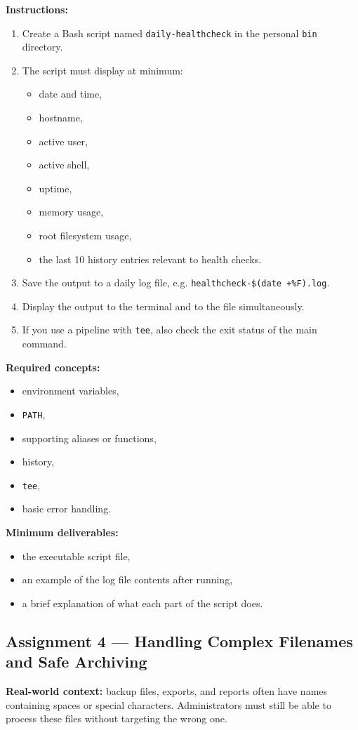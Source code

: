 \textbf{Instructions:}
\begin{enumerate}
  \item Create a Bash script named \texttt{daily-healthcheck} in the personal
    \texttt{bin} directory.
  \item The script must display at minimum:
  \begin{itemize}
    \item date and time,
    \item hostname,
    \item active user,
    \item active shell,
    \item uptime,
    \item memory usage,
    \item root filesystem usage,
    \item the last 10 history entries relevant to health checks.
  \end{itemize}
  \item Save the output to a daily log file, e.g.
    \texttt{healthcheck-\$(date +\%F).log}.
  \item Display the output to the terminal and to the file simultaneously.
  \item If you use a pipeline with \texttt{tee}, also check the exit status
    of the main command.
\end{enumerate}

\textbf{Required concepts:}
\begin{itemize}
  \item environment variables,
  \item \texttt{PATH},
  \item supporting aliases or functions,
  \item history,
  \item \texttt{tee},
  \item basic error handling.
\end{itemize}

\textbf{Minimum deliverables:}
\begin{itemize}
  \item the executable script file,
  \item an example of the log file contents after running,
  \item a brief explanation of what each part of the script does.
\end{itemize}

\subsection*{Assignment 4 --- Handling Complex Filenames and Safe Archiving}
\textbf{Real-world context:} backup files, exports, and reports often have
names containing spaces or special characters. Administrators must still be
able to process these files without targeting the wrong one.

